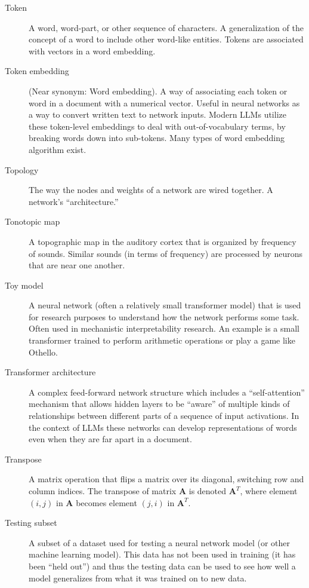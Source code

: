 \begin{description}
\item[Token] A word, word-part, or other sequence of characters. A generalization of the concept of a word to include other word-like entities. Tokens are associated with vectors in a word embedding.

\item[Token embedding] (Near synonym: Word embedding). A way of associating each token or word in a document with a numerical vector. Useful in neural networks as a way to convert written text to network inputs. Modern LLMs utilize these token-level embeddings to deal with out-of-vocabulary terms, by breaking words down into sub-tokens. Many types of word embedding algorithm exist.

\item[Topology] The way the nodes and weights of a network are wired together. A network's ``architecture.''

\item[Tonotopic map] A topographic map in the auditory cortex that is organized by frequency of sounds. Similar sounds (in terms of frequency) are processed by neurons that are near one another.

\item[Toy model] A neural network (often a relatively small transformer model) that is used for research purposes to understand how the network performs some task. Often used in mechanistic interpretability research. An example is a small transformer trained to perform arithmetic operations or play a game like Othello.

\item[Transformer architecture] A complex feed-forward network structure which includes a ``self-attention'' mechanism that allows hidden layers to be ``aware'' of multiple kinds of relationships between different parts of a sequence of input activations. In the context of LLMs these networks can develop representations of words even when they are far apart in a document.

\item[Transpose] A matrix operation that flips a matrix over its diagonal, switching row and column indices. The transpose of matrix $\textbf{A}$ is denoted $\textbf{A}^T$, where element $(i,j)$ in $\textbf{A}$ becomes element $(j,i)$ in $\textbf{A}^T$. 

\item[Testing subset] A subset of a dataset used for testing a neural network model (or other machine learning model). This data has not been used in training (it has been ``held out'') and thus the testing data can be used to see how well a model generalizes from what it was trained on to new data.


\end{description}

